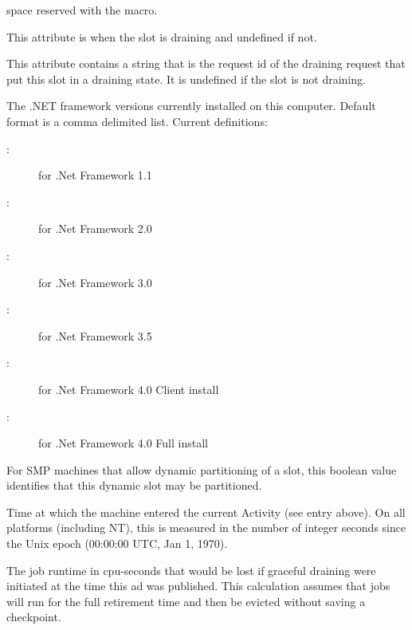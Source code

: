 \begin{description}
space reserved with the  macro.
%
\item[\AdAttr{Draining}:] This attribute is  when the slot
is draining and undefined if not.
%
\item[\AdAttr{DrainingRequestId}:] This attribute contains a string that
is the request id of the draining request that put this slot in a draining
state.  It is undefined if the slot is not draining.
%
\item[\AdAttr{DotNetVersions}:] The .NET framework versions
currently installed on this computer. 
Default format is a comma delimited list. 
Current definitions:
  \begin{description}
  \item[:] for .Net Framework 1.1
  \item[:] for .Net Framework 2.0
  \item[:] for .Net Framework 3.0
  \item[:] for .Net Framework 3.5
  \item[:] for .Net Framework 4.0 Client install
  \item[:] for .Net Framework 4.0 Full install
  \end{description}
%
\label{DynamicSlot-machine-attribute} 
\item[\AdAttr{DynamicSlot}:] For SMP machines that allow dynamic
partitioning of a slot,
this boolean value identifies that this dynamic slot may be partitioned.
%
\item[\AdAttr{EnteredCurrentActivity}:] Time at which the machine
entered the current Activity (see  entry above).  On
all platforms (including NT), this is measured in the number of
integer seconds since the Unix epoch (00:00:00 UTC, Jan 1, 1970).
%
\item[\AdAttr{ExpectedMachineGracefulDrainingBadput}:] The
job runtime in cpu-seconds that would be lost if graceful draining
were initiated at the time this ad was published.  This calculation assumes
that jobs will run for the full retirement time and then be evicted
without saving a checkpoint.
%

\end{description}
